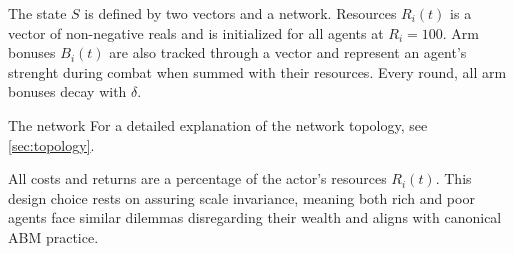 
The state $S$ is defined by two vectors and a network. 
Resources $R_i(t)$ is a vector of non-negative reals and is initialized for all agents at $R_i = 100$. 
Arm bonuses $B_i(t)$ are also tracked through a vector and represent an agent's strenght during combat when summed with their resources. Every round, all arm bonuses decay with $\delta$.

The network 
For a detailed explanation of the network topology, see \ref{sec:topology}.

All costs and returns are a percentage of the actor's resources $R_i(t)$. This design choice rests on assuring scale invariance, meaning both rich and poor agents face similar dilemmas disregarding their wealth and aligns with canonical ABM practice. %


%
%

